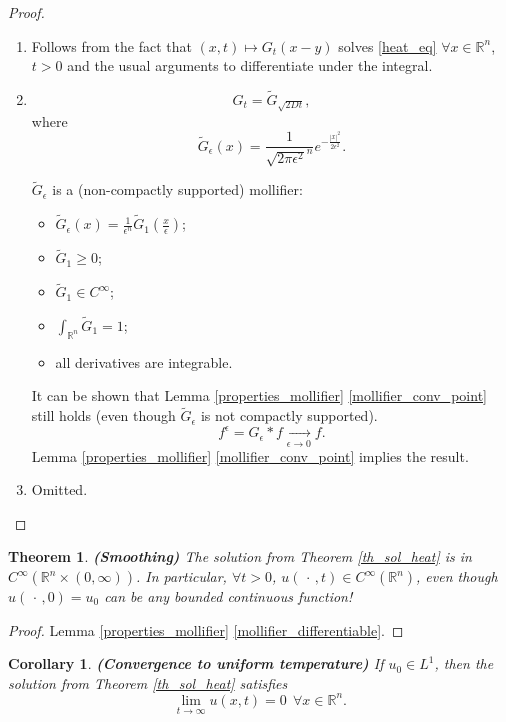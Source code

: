 \documentclass[12pt]{article}
\newtheorem{theorem}{Theorem}[section]
\newtheorem{corollary}{Corollary}[section]
\theoremstyle{definition}
\begin{document}
\begin{proof}
\begin{enumerate}[label=(\arabic*)]
\item Follows from the fact that $(x,t)\mapsto G_t(x-y)$ solves \eqref{heat_eq} $\forall x\in\mathbb{R}^n$, $t>0$ and the usual arguments to differentiate under the integral.

\item
\[G_t=\widetilde{G}_{\sqrt{2Dt}},\]
where
\[\widetilde{G}_{\epsilon}(x)=\frac{1}{\sqrt{2\pi\epsilon^2}^n}e^{-\frac{|x|^2}{2\epsilon^2}}.\]

$\widetilde{G}_{\epsilon}$ is a (non-compactly supported) mollifier:
\begin{itemize}
\item $\widetilde{G}_{\epsilon}(x)=\frac{1}{\epsilon^n}\widetilde{G}_1(\frac{x}{\epsilon})$;
\item $\widetilde{G}_1\geq0$;
\item $\widetilde{G}_1\in C^{\infty}$;
\item $\int_{\mathbb{R}^n}\widetilde{G}_1=1$;
\item all derivatives are integrable.
\end{itemize}

It can be shown that Lemma \ref{properties_mollifier} \ref{mollifier_conv_point} still holds (even though $\widetilde{G}_{\epsilon}$ is not compactly supported).
\[f^{\epsilon}=G_{\epsilon}*f\xrightarrow[\epsilon\to0]{}f.\]
Lemma \ref{properties_mollifier} \ref{mollifier_conv_point} implies the result.

\item Omitted.
\end{enumerate}
\end{proof}

\begin{theorem}
\emph{\textbf{(Smoothing)}} The solution from Theorem \ref{th_sol_heat} is in $C^{\infty}(\mathbb{R}^n\times(0,\infty))$. In particular, $\forall t>0$, $u(\,\cdot\,,t)\in C^{\infty}(\mathbb{R}^n)$, even though $u(\,\cdot\,,0)=u_0$ can be any bounded continuous function!
\end{theorem}

\begin{proof}
Lemma \ref{properties_mollifier} \ref{mollifier_differentiable}.
\end{proof}

\begin{corollary}
\emph{\textbf{(Convergence to uniform temperature)}} If $u_0\in L^1$, then the solution from Theorem \ref{th_sol_heat} satisfies
\[\lim_{t\to\infty}u(x,t)=0\ \ \forall x\in\mathbb{R}^n.\]
\end{corollary}
\end{document}
